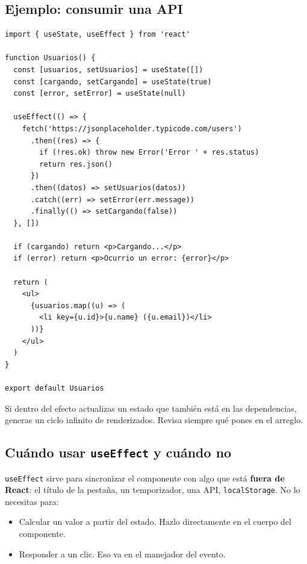 \documentclass[11pt,a4paper]{article}
\newcommand{\cmd}[1]{\texttt{\color{reactdark}#1}}
\begin{document}
\subsection{Ejemplo: consumir una API}

\begin{lstlisting}[language=JSX,title={\small\ttfamily src/components/Usuarios.jsx}]
import { useState, useEffect } from 'react'

function Usuarios() {
  const [usuarios, setUsuarios] = useState([])
  const [cargando, setCargando] = useState(true)
  const [error, setError] = useState(null)

  useEffect(() => {
    fetch('https://jsonplaceholder.typicode.com/users')
      .then((res) => {
        if (!res.ok) throw new Error('Error ' + res.status)
        return res.json()
      })
      .then((datos) => setUsuarios(datos))
      .catch((err) => setError(err.message))
      .finally(() => setCargando(false))
  }, [])

  if (cargando) return <p>Cargando...</p>
  if (error) return <p>Ocurrio un error: {error}</p>

  return (
    <ul>
      {usuarios.map((u) => (
        <li key={u.id}>{u.name} ({u.email})</li>
      ))}
    </ul>
  )
}

export default Usuarios
\end{lstlisting}

\begin{atencion}
Si dentro del efecto actualizas un estado que también está en las dependencias, generas un ciclo infinito de renderizados. Revisa siempre qué pones en el arreglo.
\end{atencion}

\subsection{Cuándo usar \texttt{useEffect} y cuándo no}

\cmd{useEffect} sirve para sincronizar el componente con algo que está \textbf{fuera de React}: el título de la pestaña, un temporizador, una API, \cmd{localStorage}. No lo necesitas para:
\begin{itemize}
  \item Calcular un valor a partir del estado. Hazlo directamente en el cuerpo del componente.
  \item Responder a un clic. Eso va en el manejador del evento.
\end{itemize}
\end{document}
